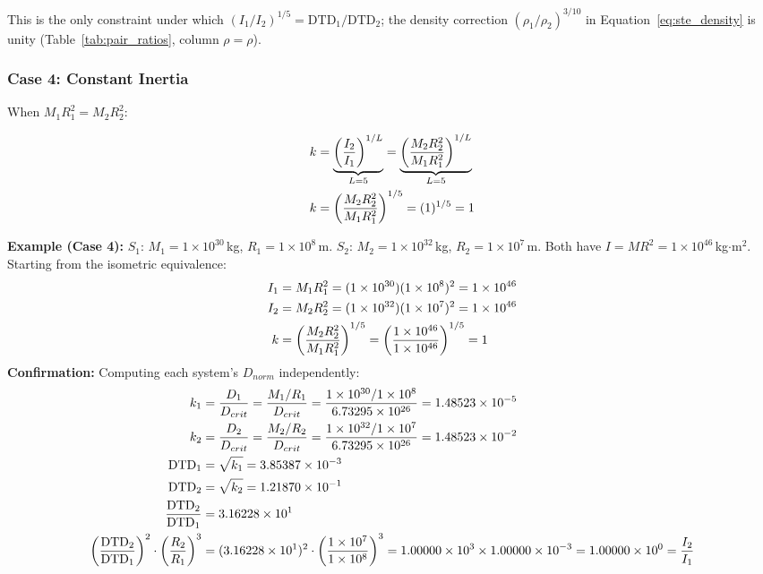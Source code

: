 \documentclass[twoside,twocolumn,9pt]{article}
\begin{document}
\noindent This is the only constraint under which $(I_1/I_2)^{1/5} = \text{DTD}_1/\text{DTD}_2$; the density correction $(\rho_1/\rho_2)^{3/10}$ in Equation~\ref{eq:ste_density} is unity (Table~\ref{tab:pair_ratios}, column $\rho = \rho$).

\subsubsection*{Case 4: Constant Inertia}

When $M_1 R_1^2 = M_2 R_2^2$:

\begin{align}
k &= \underbrace{\left(\frac{I_2}{I_1}\right)^{1/L}}_{L=5} = \underbrace{\left(\frac{M_2 R_2^2}{M_1 R_1^2}\right)^{1/L}}_{L=5} \notag \\
k &= \left(\frac{M_2 R_2^2}{M_1 R_1^2}\right)^{1/5} = (1)^{1/5} = 1
\end{align}

\begin{mdframed}
\textbf{Example (Case 4):} $S_1$: $M_1 = 1 \times 10^{30}$\,kg, $R_1 = 1 \times 10^{8}$\,m. $S_2$: $M_2 = 1 \times 10^{32}$\,kg, $R_2 = 1 \times 10^{7}$\,m. Both have $I = MR^2 = 1 \times 10^{46}$\,kg$\cdot$m$^2$. Starting from the isometric equivalence:
\begin{align}
I_1 &= M_1 R_1^2 = (1 \times 10^{30})(1 \times 10^{8})^2 = 1 \times 10^{46} \notag \\
I_2 &= M_2 R_2^2 = (1 \times 10^{32})(1 \times 10^{7})^2 = 1 \times 10^{46} \notag \\
k &= \left(\frac{M_2 R_2^2}{M_1 R_1^2}\right)^{1/5}
= \left(\frac{1 \times 10^{46}}{1 \times 10^{46}}\right)^{1/5}
= 1 \notag
\end{align}
\textbf{Confirmation:} Computing each system's $D_{norm}$ independently:
\begin{align}
k_1 &= \frac{D_1}{D_{crit}} = \frac{M_1/R_1}{D_{crit}}
= \frac{1 \times 10^{30}/1 \times 10^{8}}{6.73295 \times 10^{26}}
= 1.48523 \times 10^{-5} \notag \\
k_2 &= \frac{D_2}{D_{crit}} = \frac{M_2/R_2}{D_{crit}}
= \frac{1 \times 10^{32}/1 \times 10^{7}}{6.73295 \times 10^{26}}
= 1.48523 \times 10^{-2} \notag \\
\text{DTD}_1 &= \sqrt{k_1} = 3.85387 \times 10^{-3} \notag \\
\text{DTD}_2 &= \sqrt{k_2} = 1.21870 \times 10^{-1} \notag \\
\frac{\text{DTD}_2}{\text{DTD}_1} &= 3.16228 \times 10^{1} \notag \\
\left(\frac{\text{DTD}_2}{\text{DTD}_1}\right)^2 \cdot \left(\frac{R_2}{R_1}\right)^3
&= (3.16228 \times 10^{1})^2 \cdot \left(\frac{1 \times 10^{7}}{1 \times 10^{8}}\right)^3
= 1.00000 \times 10^{3} \times 1.00000 \times 10^{-3}
= 1.00000 \times 10^{0}
= \frac{I_2}{I_1} \notag
\end{align}
\end{mdframed}
\end{document}
